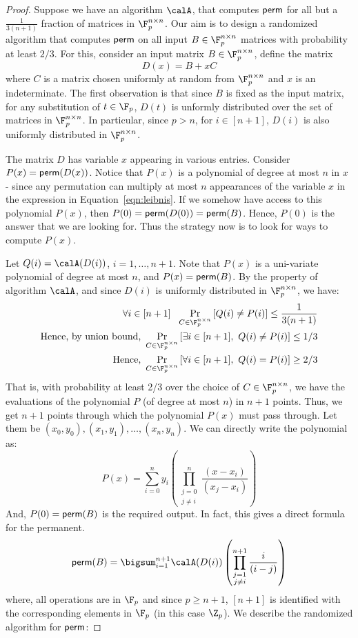 \begin{proof}
Suppose we have an algorithm $\calA$, that computes ${\sf perm}$ for all but a $\frac{1}{3(n+1)}$ fraction of matrices in $\F_p^{n \times n}$. Our aim is to design a randomized algorithm that computes ${\sf perm}$ on all input $B\in \F_p^{n \times n}$ matrices with probability at least $2/3$. For this, consider an input matrix $B\in \F_p^{n \times n}$, define the matrix
\[D(x) = B+ xC\]
where  $C$ is a matrix chosen uniformly at random from $\F_p^{n \times n}$ and $x$ is an indeterminate. The first observation is that since $B$ is fixed as the input matrix, for any substitution of $t \in \F_p$, $D(t)$ is unformly distributed over the set of matrices in $\F_p^{n \times n}$. In particular, since $p > n$, for $i \in [n+1]$, $D(i)$ is also uniformly distributed in $\F_p^{n \times n}$.

The matrix $D$ has variable $x$ appearing in various entries. Consider $P(x)= {\sf perm}(D(x))$. Notice that $P(x)$ is a polynomial of degree at most $n$ in $x$ - since any permutation can multiply at most $n$ appearances of the variable $x$ in the expression in Equation~\ref{eqn:leibnis}. If we somehow have access to this polynomial $P(x)$, then $P(0) = {\sf perm}(D(0)) = {\sf perm}(B)$. Hence, $P(0)$ is the answer that we are looking for. Thus the strategy now is to look for ways to compute $P(x)$.

Let $Q(i)= \calA(D(i))$, $i=1,\ldots ,n+1$. Note that $P(x)$ is   a uni-variate polynomial of degree at most $n$, and $P(x)={\sf perm}(B)$. By the property of algorithm $\calA$, and since $D(i)$ is uniformly distributed in $\F_p^{n \times n}$, we have:
\begin{eqnarray}
\forall i\in[n+1]~~\Pr_{C \in \F_p^{n \times n}} \left[Q(i)\neq P(i)\right] \le \frac{1}{3(n+1)} \\
\label{eqn:unionbound}
\textrm{Hence, by union bound, }\Pr_{C \in \F_p^{n \times n}}\left[\exists i \in [n+1],~ Q(i)\neq P(i)\right]\le 1/3\\
\textrm{Hence,~}\Pr_{C \in \F_p^{n \times n}}\left[\forall i \in [n+1],~ Q(i) = P(i)\right] \ge 2/3
\end{eqnarray}
That is, with probability at least 2/3 over the choice of $C \in \F_p^{n \times n}$, we have the evaluations of the polynomial $P$ (of degree at most $n$) in $n+1$ points. Thus, we get $n+1$ points through which the polynomial $P(x)$ must pass through. Let them be $(x_0,y_0),(x_1,y_1), \ldots, (x_n,y_n)$. We can directly write the polynomial as:
$$ P(x) = \sum_{i=0}^n y_i \left(\prod_{\substack{j=0\\j \ne i}}^n \frac{(x-x_i)}{(x_j-x_i)} \right) $$
And, $P(0)= {\sf perm}(B)$ is the required output. In fact, this gives a direct formula for the permanent.
$${\sf perm}(B) = \bigsum_{i=1}^{n+1} \calA(D(i)) \left(\prod_{\substack{j=1\\j \ne i}}^{n+1} \frac{i}{(i-j)} \right)$$ 
where, all operations are in $\F_p$ and since $p \ge n+1$, $[n+1]$ is identified with the corresponding elements in $\F_p$ (in this case $\Z_p$). We describe the randomized algorithm for ${\sf perm}$:


\end{proof}
